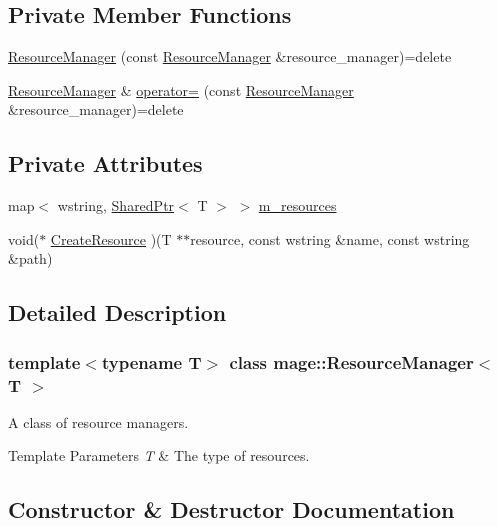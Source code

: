 \subsection*{Private Member Functions}
\begin{DoxyCompactItemize}
\item 
\hyperlink{classmage_1_1_resource_manager_a3b424e1ef7f543a2705d1124018d9921}{Resource\+Manager} (const \hyperlink{classmage_1_1_resource_manager}{Resource\+Manager} \&resource\+\_\+manager)=delete
\item 
\hyperlink{classmage_1_1_resource_manager}{Resource\+Manager} \& \hyperlink{classmage_1_1_resource_manager_a5cc1867dbb196671fb53763c98aee1dd}{operator=} (const \hyperlink{classmage_1_1_resource_manager}{Resource\+Manager} \&resource\+\_\+manager)=delete
\end{DoxyCompactItemize}
\subsection*{Private Attributes}
\begin{DoxyCompactItemize}
\item 
map$<$ wstring, \hyperlink{namespacemage_a1e01ae66713838a7a67d30e44c67703e}{Shared\+Ptr}$<$ T $>$ $>$ \hyperlink{classmage_1_1_resource_manager_a7d5f31a34e76f343988b7d6e9a62a617}{m\+\_\+resources}
\item 
void($\ast$ \hyperlink{classmage_1_1_resource_manager_a41d5a40aeaef12e2ecef0cb8f5f4a4d5}{Create\+Resource} )(T $\ast$$\ast$resource, const wstring \&name, const wstring \&path)
\end{DoxyCompactItemize}


\subsection{Detailed Description}
\subsubsection*{template$<$typename T$>$\newline
class mage\+::\+Resource\+Manager$<$ T $>$}

A class of resource managers.


\begin{DoxyTemplParams}{Template Parameters}
{\em T} & The type of resources. \\
\hline
\end{DoxyTemplParams}


\subsection{Constructor \& Destructor Documentation}
\hypertarget{classmage_1_1_resource_manager_ab8596e3f3c9fa2eb693cf4cc9aeb95d9}{}\label{classmage_1_1_resource_manager_ab8596e3f3c9fa2eb693cf4cc9aeb95d9} 
